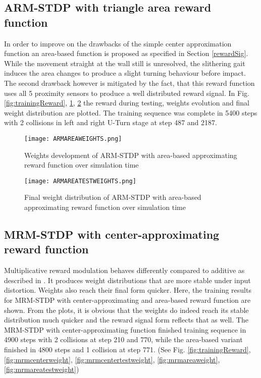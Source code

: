 \subsection{ARM-STDP with triangle area reward function}
In order to improve on the drawbacks of the simple center approximation function an area-based function is proposed as specified in Section \ref{rewardSig}. While the movement straight at the wall still is unresolved, the slithering gait induces the area changes to produce a slight turning behaviour before impact. The second drawback however is mitigated by the fact, that this reward function uses all 5 proximity sensors to produce a well distributed reward signal. In Fig. \ref{fig:trainingReward}, \ref{fig:armareaweight}, \ref{fig:armareatestweight} the reward during testing, weights evolution and final weight distribution are plotted. The training sequence was complete in 5400 steps with 2 collisions in left and right U-Turn stage at step 487 and 2187.

\begin{figure}[h]
	\centering
	\texttt{[image: ARMAREAWEIGHTS.png]}
	\caption{Weights development of ARM-STDP with area-based approximating reward function over simulation time}\label{fig:armareaweight}
\end{figure}
\begin{figure}[h]
	\centering
	\texttt{[image: ARMAREATESTWEIGHTS.png]}
	\caption{Final weight distribution of ARM-STDP with area-based approximating reward function over simulation time}\label{fig:armareatestweight}
\end{figure}

\subsection{MRM-STDP with center-approximating reward function}

Multiplicative reward modulation behaves differently compared to additive as described in \cite{16}. It produces weight distributions that are more stable under input distortion. Weights also reach their final form quicker. Here, the training results for MRM-STDP with center-approximating and area-based reward function are shown. From the plots, it is obvious that the weights do indeed reach its stable distribution much quicker and the reward signal form reflects that as well. The MRM-STDP with center-approximating function finished training sequence in 4900 steps with 2 collisions at step 210 and 770, while the area-based variant finished in 4800 steps and 1 collision at step 771. (See Fig. \ref{fig:trainingReward}, \ref{fig:mrmcenterweight}, \ref{fig:mrmcentertestweight}, \ref{fig:mrmareaweight}, \ref{fig:mrmareatestweight})


